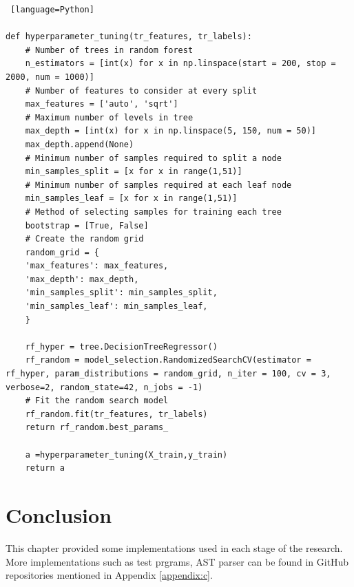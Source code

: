 \begin{lstlisting} [language=Python]

def hyperparameter_tuning(tr_features, tr_labels):
	# Number of trees in random forest
	n_estimators = [int(x) for x in np.linspace(start = 200, stop = 2000, num = 1000)]
	# Number of features to consider at every split
	max_features = ['auto', 'sqrt']
	# Maximum number of levels in tree
	max_depth = [int(x) for x in np.linspace(5, 150, num = 50)]
	max_depth.append(None)
	# Minimum number of samples required to split a node
	min_samples_split = [x for x in range(1,51)]
	# Minimum number of samples required at each leaf node
	min_samples_leaf = [x for x in range(1,51)]
	# Method of selecting samples for training each tree
	bootstrap = [True, False]
	# Create the random grid
	random_grid = {
	'max_features': max_features,
	'max_depth': max_depth,
	'min_samples_split': min_samples_split,
	'min_samples_leaf': min_samples_leaf,
	}
	
	rf_hyper = tree.DecisionTreeRegressor()
	rf_random = model_selection.RandomizedSearchCV(estimator = rf_hyper, param_distributions = random_grid, n_iter = 100, cv = 3, verbose=2, random_state=42, n_jobs = -1)
	# Fit the random search model
	rf_random.fit(tr_features, tr_labels)
	return rf_random.best_params_
	
	a =hyperparameter_tuning(X_train,y_train)
	return a

\end{lstlisting}


\section{Conclusion}

This chapter provided some implementations used in each stage of the research. More implementations such as test prgrams, AST parser can be found in GitHub repositories mentioned in Appendix \ref{appendix:c}.
